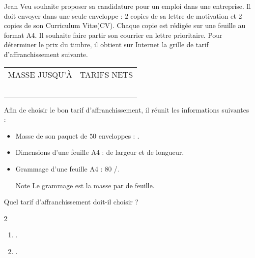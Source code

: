 \begin{exercice*}[Courrier]
    Jean Veu souhaite proposer sa candidature pour un emploi dans une entreprise.
    Il doit envoyer dans une seule enveloppe : $2$ copies de sa lettre de motivation
    et $2$ copies de son Curriculum Vit\ae (CV). Chaque copie est rédigée sur une feuille
    au format A4. Il souhaite faire partir son courrier en lettre prioritaire. Pour déterminer
    le prix du timbre, il obtient sur Internet la grille de tarif d'affranchissement suivante.

    \begin{tabularx}{0.48\textwidth}{|C|C|}
        \hline
        \tabularnewline        
        \hline
        MASSE JUSQU'À & TARIFS NETS \tabularnewline
        \hline
        & \tabularnewline
        \hline
        & \tabularnewline
        \hline
        & \tabularnewline
        \hline
        & \tabularnewline
        \hline
        & \tabularnewline
        \hline
    \end{tabularx}

    Afin de choisir le bon tarif d'affranchissement, il réunit les informations suivantes :
    \begin{itemize}
        \item Masse de son paquet de $50$ enveloppes : .
        \item Dimensions d'une feuille A4 :  de largeur et  de longueur.
        \item Grammage d'une feuille A4 : $80$ \Masse{}/\Aire[m]{}.
    
        \begin{myBox}{Note}
            Le grammage est la masse par \Aire[m]{} de feuille.
        \end{myBox} 
    \end{itemize}

    Quel tarif d'affranchissement doit-il choisir ?
\end{exercice*}
\begin{corrige}
    \phantom{rrr}    
    \begin{multicols}2
        \begin{enumerate}
            \item .
            \item .
        \end{enumerate}
    \end{multicols}
\end{corrige}

